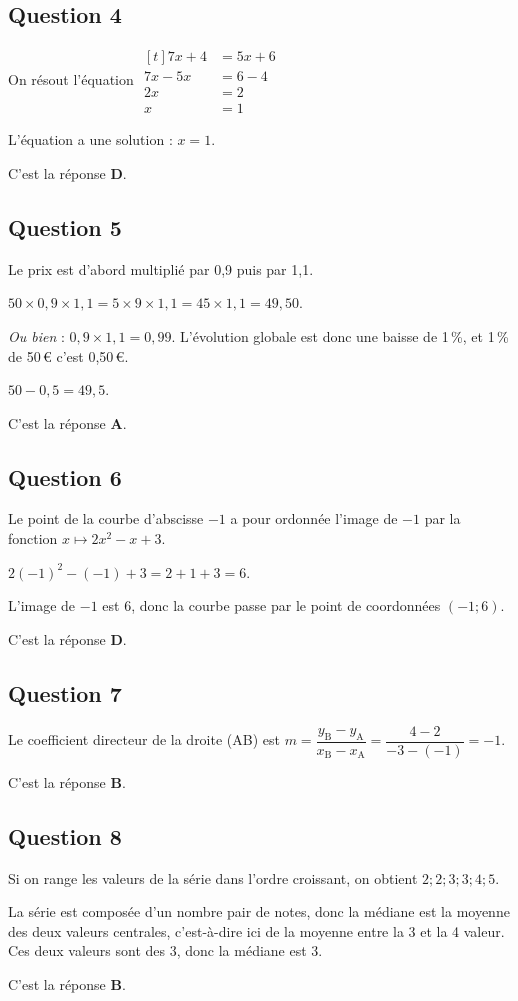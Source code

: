 \subsection*{Question 4}
	On résout l'équation $\begin{aligned}[t] 7 x+4 & = 5 x+ 6 \\
	7x-5x &= 6-4\\
	2x &= 2\\
	x &= 1
	\end{aligned}$

	L'équation a une solution : $x = 1$.

	C'est la réponse \textbf{D}.

\subsection*{Question 5}
	Le prix est d'abord multiplié par 0,9 puis par 1,1.

	$50 \times 0,9 \times 1,1= 5 \times 9 \times 1,1 = 45 \times 1,1 = 49,50$.

	\emph{Ou bien} : $0,9\times 1,1= 0,99$. \quad L'évolution globale est donc une baisse de 1\,\%, et 1\,\% de 50\,\euro{} c'est 0,50\,\euro{}.

	$50 - 0,5 = 49,5$.

	C'est la réponse \textbf{A}.

\subsection*{Question 6}
	Le point de la courbe d'abscisse $-1$ a pour ordonnée l'image de $-1$ par la fonction $x \mapsto 2 x^{2}-x+3$.

	$2 (-1)^{2}-(-1)+3=2+1+3=6$.

	L'image de $-1$ est 6, donc la courbe passe par le point de coordonnées $(-1 ; 6)$.

	C'est la réponse \textbf{D}.

\subsection*{Question 7}
	Le coefficient directeur de la droite (AB) est \quad $m=\dfrac{y_{\mathrm{B}}-y_{\mathrm{A}}}{x_{\mathrm{B}}-x_{\mathrm{A}}}=\dfrac{4-2}{-3-(-1)}=-1$.

	C'est la réponse \textbf{B}.

\subsection*{Question 8}
	Si on range les valeurs de la série dans l'ordre croissant, on obtient \quad $2 ; 2 ; 3 ; 3 ; 4 ; 5$.

	La série est composée d'un nombre pair de notes, donc la médiane est la moyenne des deux valeurs centrales, c'est-à-dire ici de la moyenne entre la 3 et la 4 valeur. Ces deux valeurs sont des 3, donc la médiane est 3.

	C'est la réponse \textbf{B}.



